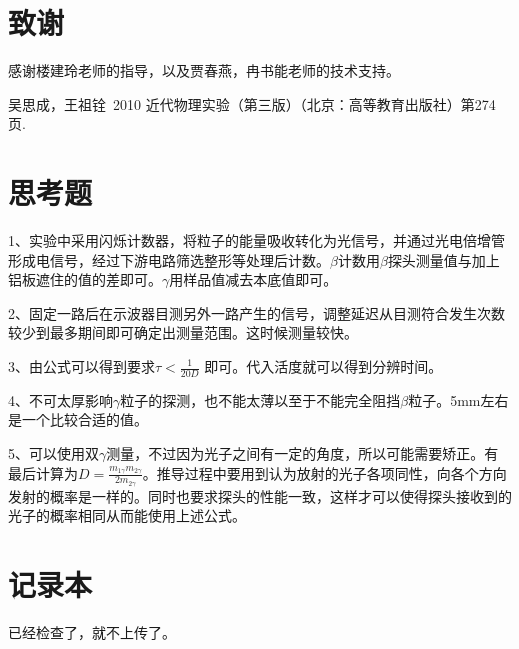 \documentclass[aps,pre,12pt,preprint,onecolumn,showpacs,showkeys,UTF8]{revtex4-1}
\begin{document}
\section{致谢} 
感谢楼建玲老师的指导，以及贾春燕，冉书能老师的技术支持。


\begin{thebibliography}{}
	 吴思成，王祖铨~2010 近代物理实验（第三版）（北京：高等教育出版社）第274页.%
%
\end{thebibliography}

\clearpage
\appendix
\section{思考题}

1、实验中采用闪烁计数器，将粒子的能量吸收转化为光信号，并通过光电倍增管形成电信号，经过下游电路筛选整形等处理后计数。$\beta$计数用$\beta$探头测量值与加上铝板遮住的值的差即可。$\gamma$用样品值减去本底值即可。

2、固定一路后在示波器目测另外一路产生的信号，调整延迟从目测符合发生次数较少到最多期间即可确定出测量范围。这时候测量较快。

3、由公式可以得到要求$\tau < \frac{1}{20D}$ 即可。代入活度就可以得到分辨时间。

4、不可太厚影响$\gamma$粒子的探测，也不能太薄以至于不能完全阻挡$\beta$粒子。5mm左右是一个比较合适的值。

5、可以使用双$\gamma$测量，不过因为光子之间有一定的角度，所以可能需要矫正。有最后计算为$D=\frac{m_{1\gamma}m_{2\gamma}}{2m_{2\gamma}}$。推导过程中要用到认为放射的光子各项同性，向各个方向发射的概率是一样的。同时也要求探头的性能一致，这样才可以使得探头接收到的光子的概率相同从而能使用上述公式。

\section{记录本}
已经检查了，就不上传了。
\end{document}
